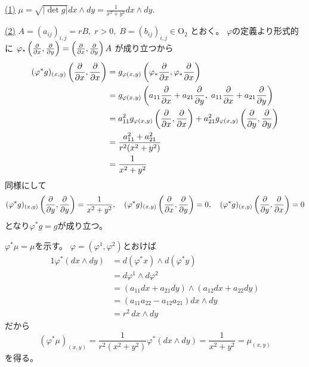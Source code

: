 \documentclass[report, notitlepage]{jlreq}
\begin{document}
\begin{answer}
    \uline{(1)} \quad
    $\mu = \sqrt{|\det g|} dx \wedge dy = \frac{1}{x^2 + y^2} dx \wedge dy$.

    \uline{(2)} \quad
    $A = (a_{ij})_{i, j} = rB, \; 
        r > 0, \;
        B = (b_{ij})_{i, j} \in \mathrm{O}_2$
    とおく。
    $\varphi$の定義より形式的に
    $\varphi_*
        \left(
            \deldel{x}, \deldel{y}
        \right)
        =
        \left(
            \deldel{x}, \deldel{y}
        \right)
        A$
    が成り立つから
    \begin{alignat}{1}
        (\varphi^* g)_{(x, y)} \left( \deldel{x}, \deldel{x} \right)
            &= g_{\varphi(x, y)}
                \left( \varphi_* \deldel{x}, \varphi_* \deldel{x} \right) \\
            &= g_{\varphi(x, y)}
                \left(
                    a_{11} \deldel{x} + a_{21} \deldel{y}, \;
                    a_{11} \deldel{x} + a_{21} \deldel{y}
                \right) \\
            &= a_{11}^2 g_{\varphi(x, y)}
                \left( \deldel{x}, \deldel{x} \right)
                + a_{21}^2 g_{\varphi(x, y)}
                \left( \deldel{y}, \deldel{y} \right) \\
            &= \frac{a_{11}^2 + a_{21}^2}{r^2 (x^2 + y^2)} \\
            &= \frac{1}{x^2 + y^2}
    \end{alignat}
    同様にして
    \begin{equation}
        (\varphi^* g)_{(x, y)} \left( \deldel{y}, \deldel{y} \right)
            = \frac{1}{x^2 + y^2},
        \quad
        (\varphi^* g)_{(x, y)} \left( \deldel{x}, \deldel{y} \right)
            = 0,
        \quad
        (\varphi^* g)_{(x, y)} \left( \deldel{y}, \deldel{x} \right)
            = 0
    \end{equation}
    となり$\varphi^* g = g$が成り立つ。

    $\varphi^* \mu = \mu$を示す。
    $\varphi = (\varphi^1, \varphi^2)$とおけば
    \begin{alignat}{1}
        \varphi^* (dx \wedge dy)
            &= d(\varphi^* x) \wedge d(\varphi^* y) \\
            &= d\varphi^1 \wedge d\varphi^2 \\
            &= (a_{11} dx + a_{21} dy) \wedge (a_{12} dx + a_{22} dy) \\
            &= (a_{11} a_{22} - a_{12} a_{21}) dx \wedge dy \\
            &= r^2 \, dx \wedge dy
    \end{alignat}
    だから
    \begin{equation}
        (\varphi^* \mu)_{(x, y)}
            = \frac{1}{r^2 (x^2 + y^2)} \varphi^* (dx \wedge dy)
            = \frac{1}{x^2 + y^2}
            = \mu_{(x, y)}
    \end{equation}
    を得る。


\end{answer}
\end{document}
